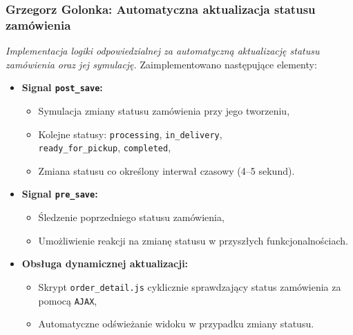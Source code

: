 \documentclass[12pt,a4paper,oneside]{article}
\theoremstyle{definition}
\numberwithin{equation}{section}
\begin{document}
\subsubsection{Grzegorz Golonka: Automatyczna aktualizacja statusu zamówienia}
\label{section:1.3.29}
\textit{
Implementacja logiki odpowiedzialnej za automatyczną aktualizację statusu zamówienia oraz jej symulację.
}
Zaimplementowano następujące elementy:
\begin{itemize}
    \item \textbf{Signal \texttt{post\_save}:}
    \begin{itemize}
        \item Symulacja zmiany statusu zamówienia przy jego tworzeniu,
        \item Kolejne statusy: \texttt{processing}, \texttt{in\_delivery},\\ \texttt{ready\_for\_pickup}, \texttt{completed},
        \item Zmiana statusu co określony interwał czasowy (4–5 sekund).
    \end{itemize}
    \item \textbf{Signal \texttt{pre\_save}:}
    \begin{itemize}
        \item Śledzenie poprzedniego statusu zamówienia,
        \item Umożliwienie reakcji na zmianę statusu w przyszłych funkcjonalnościach.
    \end{itemize}
    \item \textbf{Obsługa dynamicznej aktualizacji:}
    \begin{itemize}
        \item Skrypt \texttt{order\_detail.js} cyklicznie sprawdzający status zamówienia za pomocą \texttt{AJAX},
        \item Automatyczne odświeżanie widoku w przypadku zmiany statusu.
    \end{itemize}
\end{itemize}
%
%
\end{document}
